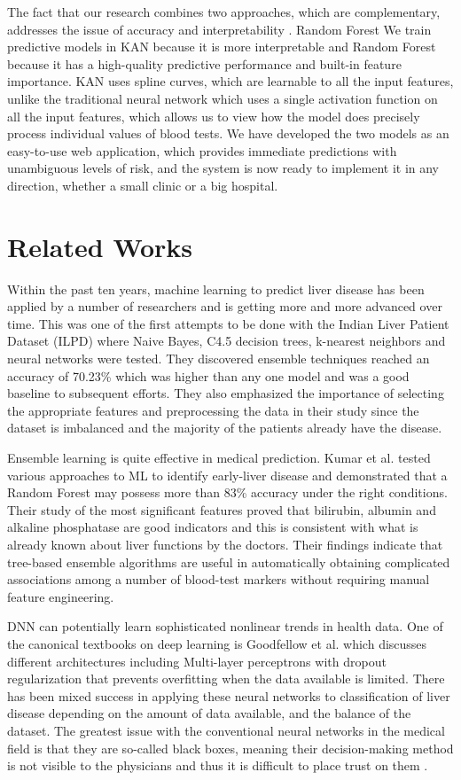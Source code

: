 \documentclass[conference]{IEEEtran}
\begin{document}
The fact that our research combines two approaches, which are complementary, addresses the issue of accuracy and interpretability \cite{liu2024}. Random Forest We train predictive models in KAN because it is more interpretable and Random Forest because it has a high-quality predictive performance and built-in feature importance. KAN uses spline curves, which are learnable to all the input features, unlike the traditional neural network which uses a single activation function on all the input features, which allows us to view how the model does precisely process individual values of blood tests. We have developed the two models as an easy-to-use web application, which provides immediate predictions with unambiguous levels of risk, and the system is now ready to implement it in any direction, whether a small clinic or a big hospital.

\section{Related Works}

Within the past ten years, machine learning to predict liver disease has been applied by a number of researchers and is getting more and more advanced over time. This was one of the first attempts to be done with the Indian Liver Patient Dataset (ILPD) \cite{ramana2011} where Naive Bayes, C4.5 decision trees, k-nearest neighbors and neural networks were tested. They discovered ensemble techniques reached an accuracy of 70.23\%  which was higher than any one model and was a good baseline to subsequent efforts. They also emphasized the importance of selecting the appropriate features and preprocessing the data in their study since the dataset is imbalanced and the majority of the patients already have the disease.

Ensemble learning is quite effective in medical prediction. Kumar et al. \cite{kumar2020}tested various approaches to ML to identify early-liver disease and demonstrated that a Random Forest may possess more than 83\% accuracy under the right conditions. Their study of the most significant features proved that bilirubin, albumin and alkaline phosphatase are good indicators and this is consistent with what is already known about liver functions by the doctors. Their findings indicate that tree-based ensemble algorithms are useful in automatically obtaining complicated associations among a number of blood-test markers without requiring manual feature engineering.

DNN can potentially learn sophisticated nonlinear trends in health data. One of the canonical textbooks on deep learning is Goodfellow et al. \cite{goodfellow2016} which discusses different architectures including Multi-layer perceptrons with dropout regularization that prevents overfitting when the data available is limited. There has been mixed success in applying these neural networks to classification of liver disease depending on the amount of data available, and the balance of the dataset. The greatest issue with the conventional neural networks in the medical field is that they are so-called black boxes, meaning their decision-making method is not visible to the physicians and thus it is difficult to place trust on them \cite{miotto2018}.
\end{document}
